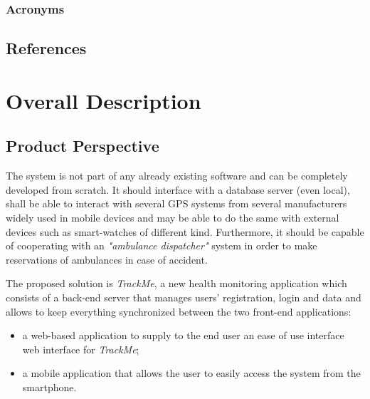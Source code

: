 \documentclass[a4paper]{article}
\begin{document}
            \subsubsection{Acronyms}
            \begin{acronym}
            \end{acronym}
            
    \subsection{References}
        \printbibliography[heading=none]
\newpage
\section{Overall Description}
    \subsection{Product Perspective}
    
    The system is not part of any already existing software and can be completely developed from scratch. It should interface with a database server (even local), shall be able to interact with several GPS systems from several manufacturers widely used in mobile devices and may be able to do the same with external devices such as smart-watches of different kind. Furthermore, it should be capable of cooperating with an \textit{"ambulance dispatcher"} system in order to make reservations of ambulances in case of accident.
    
    The proposed solution is \textit{TrackMe}, a new health monitoring application which consists of a back-end server that manages users' registration, login and data and allows to keep everything synchronized between the two front-end applications:
        \begin{itemize}
            \item a web-based application to supply to the end user an ease of use interface web interface for \textit{TrackMe};
            \item a mobile application that allows the user to easily access the system from the smartphone.
        \end{itemize}
    
\end{document}
